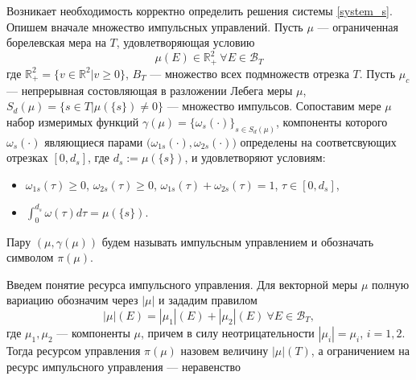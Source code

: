 
Возникает необходимость корректно определить решения системы
\eqref{system_s}. Опишем вначале множество импульсных управлений. Пусть $\mu$ ---
ограниченная борелевская мера на $T$, удовлетворяющая условию
\begin{equation*}
  \mu(E) \in \mathbb{R}_+^2 \ \forall E \in \mathcal{B}_T
\end{equation*}
где $\mathbb{R}_+^2 = \{v \in \mathbb{R}^2 | v \ge 0\}$, $B_T$ ---
множество всех подмножеств отрезка $T$. Пусть $\mu_c$ --- непрерывная
состовляющая в разложении Лебега меры $\mu$,
$S_d(\mu) = \{ s \in T | \mu(\{s\}) \neq 0\}$ --- множество
импульсов. Сопоставим мере $\mu$ набор измеримых функций
$\gamma(\mu) = \{ \omega_s(\cdot) \}_{s\in S_d(\mu)}$, компоненты
которого $\omega_s(\cdot)$ являющиеся парами
$\big(\omega_{1s}(\cdot),\omega_{2s}(\cdot)\big)$ определены на
соответсвующих отрезках $[0,d_s]$, где $d_s := \mu(\{s\})$, и
удовлетворяют условиям:
\begin{itemize}
  \item $\omega_{1s}(\tau) \ge 0$, $\omega_{2s}(\tau) \ge 0$, 
    $\omega_{1s}(\tau) + \omega_{2s}(\tau) = 1$, $\tau \in [0,d_s]$,
  \item $\displaystyle\int_{0}^{d_s} \omega(\tau) d\tau = \mu(\{s\})$.
\end{itemize}
Пару $(\mu,\gamma(\mu))$ будем называть импульсным управлением и
обозначать символом $\pi(\mu)$.

Введем понятие ресурса импульсного управления. Для векторной меры
$\mu$ полную вариацию обозначим через $|\mu|$ и зададим правилом
\begin{equation*}
  |\mu|(E) = |\mu_1|(E) + |\mu_2|(E) \ \forall E \in \mathcal{B}_T,
\end{equation*}
где $\mu_1,\mu_2$ --- компоненты $\mu$, причем в силу
неотрицательности $|\mu_i| = \mu_i$, $i=1,2$. Тогда ресурсом
управления $\pi(\mu)$ назовем величину $|\mu|(T)$, а ограничением на
ресурс импульсного управления --- неравенство

